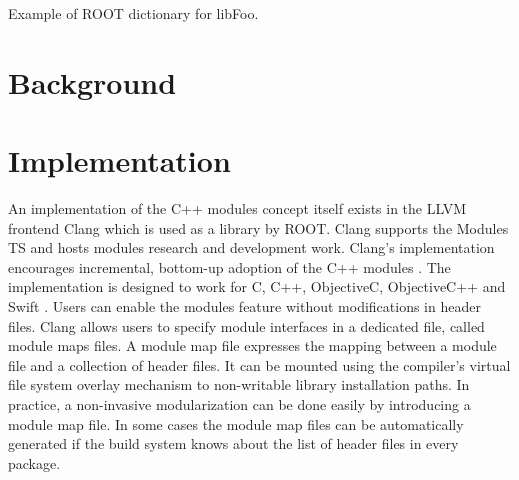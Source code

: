 \documentclass[12pt]{iopart}
\begin{document}
\begin{listing}[h]
    \noindent
    \begin{minipage}[h]{\textwidth}
    \begin{cppcode*}{}
// Foo.h
    |\label{line:foobar}|namespace foo { struct bar{}; }
    |\label{line:structs}|struct S{};

// libFoo.rootmap
    |\label{line:decls}|{ decls }
    namespace foo { }
    struct S;
 
    |\label{line:libfoo}|[ libFoo.so ]
    # List of selected classes
    class bar
    struct S

// G__Foo.cxx (aka libFoo dictionary)
    namespace {
      void TriggerDictionaryInitialization_libFoo_Impl() {
        static const char* headers[] = {"Foo.h"}
        // More scaffolding
        extern int __Cling_Autoloading_Map;
        namespace foo{struct __attribute__((annotate("$clingAutoload$Foo.h"))) bar;}
        struct __attribute__((annotate("$clingAutoload$Foo.h"))) S;
       // More initialization scaffolding.
    }
    \end{cppcode*}
    \end{minipage}
    \caption{Example of ROOT dictionary for libFoo.}
    \label{list:foo}
\end{listing}

\section{Background}

\section{Implementation}
\label{implementation}

An implementation of the C++ modules concept itself exists in the LLVM frontend Clang \cite{clang-modules-doc} which is used as a library by ROOT. Clang supports the Modules TS and hosts modules research and development work. Clang's implementation encourages incremental, bottom-up adoption of the C++ modules \cite{Smith-cppcon}. The implementation is designed to work for C, C++, ObjectiveC, ObjectiveC++ and Swift \cite{Moduralize-doc}. Users can enable the modules feature without modifications in header files. Clang allows users to specify module interfaces in a dedicated file, called module maps files. A module map file expresses the mapping between a module file and a collection of header files. It can be mounted using the compiler’s virtual file system overlay mechanism to non-writable library installation paths. In practice, a non-invasive modularization can be done easily by introducing a module map file. In some cases the module map files can be automatically generated if the build system knows about the list of header files in every package.
\end{document}
